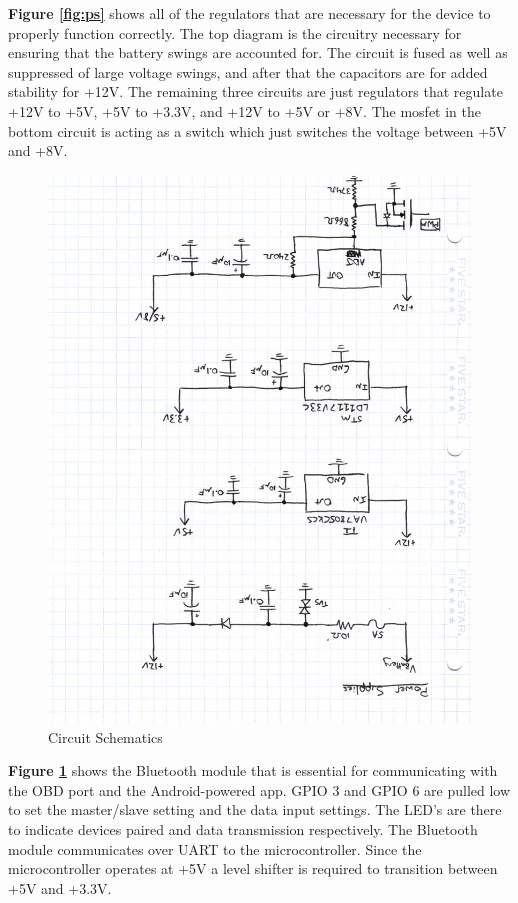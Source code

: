 \documentclass[12pt,letterpaper]{article}
\begin{document}
\textbf{Figure \ref{fig:ps}} shows all of the regulators that are necessary for the device to properly function correctly. The top diagram is the circuitry necessary for ensuring that the battery swings are accounted for. The circuit is fused as well as suppressed of large voltage swings, and after that the capacitors are for added stability for +12V. The remaining three circuits are just regulators that regulate +12V to +5V, +5V to +3.3V, and +12V to +5V or +8V. The mosfet in the bottom circuit is acting as a switch which just switches the voltage between +5V and +8V.

\begin{figure}[H]
\centering
\includegraphics[page=2, totalheight=20cm, angle=180]{images/circuit_sch.pdf}
\caption{Circuit Schematics}
\label{fig:bt}
\end{figure}

\textbf{Figure \ref{fig:bt}} shows the Bluetooth module that is essential for communicating with the OBD port and the Android-powered app. GPIO 3 and GPIO 6 are pulled low to set the master/slave setting and the data input settings. The LED's are there to indicate devices paired and data transmission respectively. The Bluetooth module communicates over UART to the microcontroller. Since the microcontroller operates at +5V a level shifter is required to transition between +5V and +3.3V.
\end{document}
